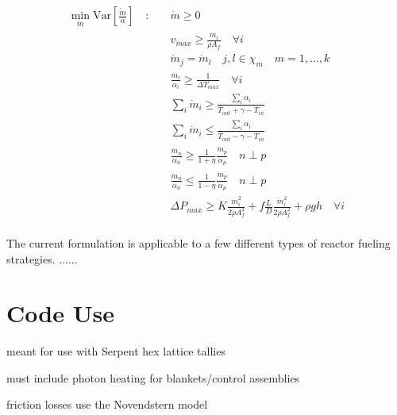 \documentclass[11pt, oneside]{article}   	%
\newcommand{\Var}{\mathrm{Var}}
\begin{document}
\begin{align*}
\min_{\dot{m}} \Var [\dot{\frac{m}{\alpha}}] \quad : \quad & \dot{m} \geq 0 \\
& v_{max} \geq \frac{\dot{m}_i}{\rho A_f} \quad \forall i \\
& \dot{m}_j = \dot{m}_l \quad  j,l \in \chi_m \quad m = 1, \dots, k \\
& \frac{\dot{m}_i}{\alpha_i} \geq \frac{1}{\Delta T_{max}} \quad \forall i \\
& \sum_{i} \dot{m}_i \geq \frac{\sum_{i} \alpha_i}{\bar{T}_{out} + \gamma - T_{in}} \\
& \sum_{i} \dot{m}_i \leq \frac{\sum_{i} \alpha_i}{\bar{T}_{out} - \gamma - T_{in}} \\
& \frac{\dot{m}_n}{\alpha_n} \geq \frac{1}{1+\eta} \frac{\dot{m}_p}{\alpha_p} \quad n \perp p \\
& \frac{\dot{m}_n}{\alpha_n} \leq \frac{1}{1-\eta} \frac{\dot{m}_p}{\alpha_p} \quad n \perp p \\
& \Delta P_{max} \geq K \frac{\dot{m}_i^2}{2 \rho A_f^2} + f \frac{L}{D} \frac{\dot{m}_i^2}{2 \rho A_f^2} + \rho g h \quad \forall i \\
\end{align*}

The current formulation is applicable to a few different types of reactor fueling strategies.
......

\section{Code Use}

meant for use with Serpent hex lattice tallies

must include photon heating for blankets/control assemblies

friction losses use the Novendstern model

\begin{thebibliography}{9}


\end{thebibliography}
\end{document}
